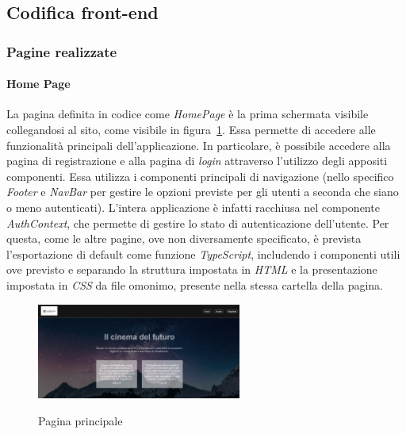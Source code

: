 \newpage
\subsection{Codifica front-end}\label{subsec:codice-front-end}

\subsubsection{Pagine realizzate}\label{subsubsec:pagine-realizzate}

\paragraph{Home Page}\label{par:home-page}

La pagina definita in codice come \textit{HomePage} è la prima schermata visibile collegandosi al sito, come visibile in figura~\ref{fig:pagina-principale}. Essa permette di accedere alle funzionalità principali dell'applicazione.
In particolare, è possibile accedere alla pagina di registrazione e alla pagina di \textit{login} attraverso l'utilizzo degli appositi componenti.
Essa utilizza i componenti principali di navigazione (nello specifico \textit{Footer} e \textit{NavBar} per gestire le opzioni 
previste per gli utenti a seconda che siano o meno autenticati). L'intera applicazione è infatti racchiusa nel componente \textit{AuthContext}, che permette di gestire lo stato di autenticazione dell'utente.
Per questa, come le altre pagine, ove non diversamente specificato, è prevista l'esportazione di default come funzione \textit{TypeScript}, includendo i componenti utili ove previsto e 
separando la struttura impostata in \textit{HTML} e la presentazione impostata in \textit{CSS} da file omonimo, presente nella stessa cartella della pagina.

\begin{figure}[ht]
    \centering
    \includegraphics[width=0.6\textwidth, alt={Pagina principale dell'applicazione}]{immagini/frontend/home.png}
    \caption{Pagina principale}\label{fig:pagina-principale}
\end{figure}

